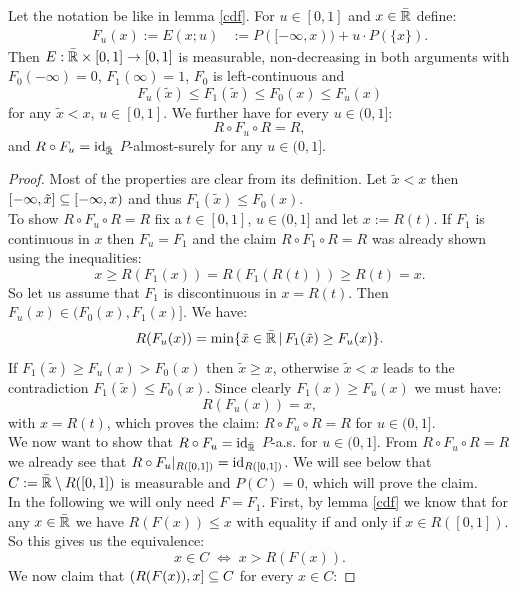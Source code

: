 \begin{Lem}
    \label{u-cdf}
    Let the notation be like in lemma \ref{cdf}. For $u \in [0,1]$ and $x \in \bar{\mathbb{R}}$ define:
    \begin{align*}
        F_u(x) := E(x;u) &:= P([-\infty,x))+u \cdot P(\{x\}).
    \end{align*}
    Then $E: \bar {\mathbb{R}} \times [0,1] \to [0,1]$ is measurable, non-decreasing in both arguments with $F_0(-\infty)=0$, $F_1(\infty)=1$, $F_0$ is left-continuous and 
    \[F_u(\tilde x) \le F_1(\tilde x) \le F_0(x) \le F_u(x)\]
    for any $\tilde x < x$, $u \in [0,1]$. 
    We further have for every $u \in (0,1]$:
    \[ R \circ F_u \circ R = R,\]
    and $R \circ F_u = \mathrm{id}_{\bar{\mathbb{R}}}$ $P$-almost-surely for any $u \in (0,1]$.
\begin{proof}
    Most of the properties are clear from its definition.
    Let $\tilde x < x$ then $[-\infty,\tilde x] \subseteq [-\infty,x)$ and thus $F_1(\tilde x) \le F_0(x)$.\\ 
    To show $R \circ F_u \circ R = R$ fix a $t \in [0,1]$, $u \in (0,1]$ and let $x:=R(t)$. If $F_1$ is continuous in $x$ then $F_u = F_1$ and the claim $R\circ F_1 \circ R=R$ was already shown using the inequalities:
\[ x \ge R(F_1(x)) = R ( F_1(R(t))) \ge R(t)=x.\]
    So let us assume that $F_1$ is discontinuous in $x=R(t)$.
    Then $F_u(x) \in (F_0(x),F_1(x)]$. We have:
    \[    R(F_u(x)) = \min \{ \tilde x \in \bar{\mathbb{R}}\,|\, F_1(\tilde x) \ge F_u(x)  \}. \]
    If $F_1(\tilde x) \ge F_u(x) > F_0(x)$ then $\tilde x \ge x$, otherwise $\tilde x < x$ leads to the contradiction $F_1(\tilde x) \le F_0(x)$. Since clearly $F_1(x) \ge F_u(x)$ we must have:
    \[ R(F_u(x)) = x,\]
    with $x=R(t)$, which proves the claim: $R \circ F_u \circ R = R$ for $u \in (0,1]$.\\
 We now want to show that $R \circ F_u = \mathrm{id}_{\bar{\mathbb{R}}}$ $P$-a.s. for $u \in (0,1]$.
From $R \circ F_u \circ R =R$ we already see that $R \circ F_u|_{R([0,1])} = \mathrm{id}_{R([0,1])}$. 
We will see below that $C:=\bar {\mathbb{R}} \setminus R([0,1])$ is measurable and $P(C) =0$, which will prove the claim.\\
In the following we will only need $F=F_1$.
First, by lemma \ref{cdf} we know that for any $x \in\bar{\mathbb{R}}$ we have $R(F(x)) \le x$ with equality if and only if $x \in R([0,1])$. So this gives us the equivalence:
\[ x \in C \; \iff\;x > R(F(x)).\]
We now claim that $(R(F(x)),x] \subseteq C$ for every $x \in C$:

\end{proof}
\end{Lem}
